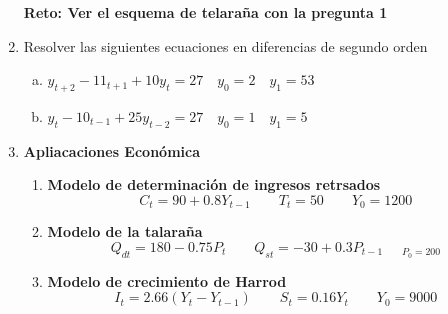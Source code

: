 \documentclass[11pt,a4paper]{article}
\begin{document}
\begin{enumerate}
\begin{multicols}{2}
\begin{enumerate}[a)]
				\end{enumerate}
			\end{multicols}
			\textbf{Reto: Ver el esquema de telaraña con la pregunta 1}
		\item Resolver las siguientes ecuaciones en diferencias de segundo orden
				\begin{enumerate}[a)]
					\item $y_{t+2}-11_{t+1}+10y_{t}=27 \quad y_{0}=2 \quad y_{1} = 53$ %
					\item $y_{t}-10_{t-1}+25y_{t-2}=27 \quad y_{0}=1 \quad y_{1} = 5$ %
				\end{enumerate}
		\item \textbf{Apliacaciones Económica}
			\begin{enumerate}
				\item \textbf{Modelo de determinación de ingresos retrsados}
					$$C_t=90+0.8Y_{t-1} \qquad T_t=50 \qquad Y_0 = 1200$$
				\item \textbf{Modelo de la talaraña}
					$$Q_{dt}=180-0.75P_t \qquad Q_{st}=-30+0.3P_{t-1 \qquad P_0=200}$$
				\item \textbf{Modelo de crecimiento de Harrod}
					$$I_t=2.66(Y_t-Y_{t-1}) \qquad S_t = 0.16Y_t \qquad Y_0=9000$$
			\end{enumerate}
\end{enumerate}
\end{document}
